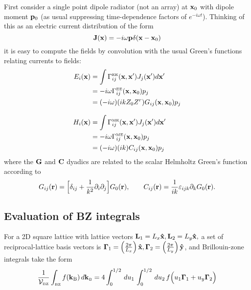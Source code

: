 \documentclass[letterpaper]{article}
\newcommand{\vbGamma}{\boldsymbol{\Gamma}}
\begin{document}
First consider a single point dipole radiator (not an array) 
at $\mathbf{x}_0$ with dipole moment $\mathbf{p}_0$ 
(as usual suppressing time-dependence factors
of $e^{-i\omega t}$). Thinking of this as an electric
current distribution of the form
$$ \mathbf{J}(\mathbf{x}) = -i\omega \mathbf{p} \delta(\mathbf{x}-\mathbf{x}_0) $$
it is easy to compute the fields by convolution with the usual
Green's functions relating currents to fields:
\begin{align*}
 E_i(\mathbf{x}) 
&= 
 \int \Gamma_{ij}^{\hbox{\tiny{EE}}}(\mathbf{x}, \mathbf{x}^\prime) J_j(\mathbf{x}^\prime) d\mathbf{x}^\prime
\\
&=-i\omega \Gamma_{ij}^{\hbox{\tiny{EE}}}(\mathbf{x}, \mathbf{x}_0) p_j
\\
&=(-i\omega)(ikZ_0Z^r) G_{ij}(\mathbf{x}, \mathbf{x}_0) p_j
\\[8pt]
H_i(\mathbf{x}) 
 &=
\int \Gamma_{ij}^{\hbox{\tiny{ME}}}(\mathbf{x}, \mathbf{x}^\prime) J_j(\mathbf{x}^\prime) d\mathbf{x}^\prime
\\
&=-i\omega \Gamma_{ij}^{\hbox{\tiny{ME}}}(\mathbf{x}, \mathbf{x}_0) p_j
\\
&=(-i\omega)(ik) C_{ij}(\mathbf{x}, \mathbf{x}_0) p_j
\end{align*}
where the $\mathbf{G}$ and $\mathbf{C}$ dyadics are related to the
scalar Helmholtz Green's function according to
$$ G_{ij}(\mathbf{r})
   = \Big[ \delta_{ij} +\frac{1}{k^2} \partial_i \partial_j \Big] G_0(\mathbf{r}),
\qquad
   C_{ij}(\mathbf{r})
   = \frac{1}{ik}\varepsilon_{ijk} \partial_k G_0(\mathbf{r}).
$$

\subsection*{Evaluation of BZ integrals}

For a 2D square lattice with lattice vectors 
$\mathbf{L}_1=L_x\mathbf{\hat x}, \mathbf{L}_2=L_y\mathbf{\hat x},$
a set of reciprocal-lattice basis vectors is 
$\vbGamma_1=\pf{2\pi}{L_x} \vbhat{x},
 \vbGamma_2=\pf{2\pi}{L_y} \vbhat{y}$,
and Brillouin-zone integrals take the form
$$ \frac{1}{\mc V\subt{BZ}} 
   \int\subt{BZ} f(\vb k\subs{B}) \, d \vb k\subt{B}
  =4\int_0^{1/2} \, d u_1 \, \int_0^{1/2} \, d u_2 \, 
   f\Big( u_1\vbGamma_1 + u_y\vbGamma_2 \Big)
$$
\end{document}
